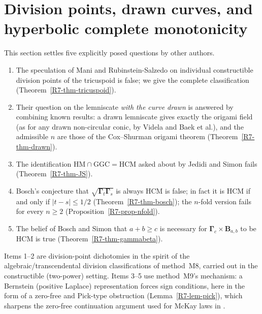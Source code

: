 \documentclass[11pt]{amsart}
\theoremstyle{definition}
\theoremstyle{remark}
\begin{document}
\providecommand{\RviiQ}{\mathbb{Q}}
\providecommand{\RviiR}{\mathbb{R}}
\providecommand{\RviiC}{\mathbb{C}}
\providecommand{\RviiZ}{\mathbb{Z}}
\providecommand{\RviiO}{\mathcal{O}}
\providecommand{\RviiK}{\mathcal{K}}
\providecommand{\RviiIm}{\operatorname{Im}}
\providecommand{\RviiRe}{\operatorname{Re}}
\providecommand{\RviiHCM}{\mathrm{HCM}}
\providecommand{\RviiHM}{\mathrm{HM}}
\providecommand{\RviiGGC}{\mathrm{GGC}}
\providecommand{\RviiGam}{\boldsymbol{\Gamma}}
\providecommand{\RviiB}{\mathbf{B}}

\section{Division points, drawn curves, and hyperbolic complete monotonicity}
\label{R7-sec}

This section settles five explicitly posed questions by other authors.
\begin{enumerate}
\item The speculation of Mani and Rubinstein-Salzedo on individual
  constructible division points of the tricuspoid is false; we give the
  complete classification (Theorem~\ref{R7-thm-tricuspoid}).
\item Their question on the lemniscate \emph{with the curve drawn} is answered
  by combining known results: a drawn lemniscate gives exactly the origami
  field (as for any drawn non-circular conic, by Videla and Baek et al.), and
  the admissible $n$ are those of the Cox--Shurman origami theorem
  (Theorem~\ref{R7-thm-drawn}).
\item The identification $\RviiHM\cap\RviiGGC=\RviiHCM$ asked about by
  Jedidi and Simon fails (Theorem~\ref{R7-thm-JS}).
\item Bosch's conjecture that $\sqrt{\RviiGam_t\RviiGam_s}$ is always HCM is
  false; in fact it is HCM if and only if $|t-s|\le 1/2$
  (Theorem~\ref{R7-thm-bosch}); the $n$-fold version fails for every
  $n\ge2$ (Proposition~\ref{R7-prop-nfold}).
\item The belief of Bosch and Simon that $a+b\ge c$ is necessary for
  $\RviiGam_c\times\RviiB_{a,b}$ to be HCM is true
  (Theorem~\ref{R7-thm-gammabeta}).
\end{enumerate}
Items 1--2 are division-point dichotomies in the spirit of the
algebraic/transcendental division classifications of method~M8, carried out
in the constructible (two-power) setting. Items 3--5 use method~M9's
mechanism: a Bernstein (positive Laplace) representation forces sign
conditions, here in the form of a zero-free and Pick-type obstruction
(Lemma~\ref{R7-lem-pick}), which sharpens the zero-free continuation
argument used for McKay laws in \cite{K-029}.
\end{document}
